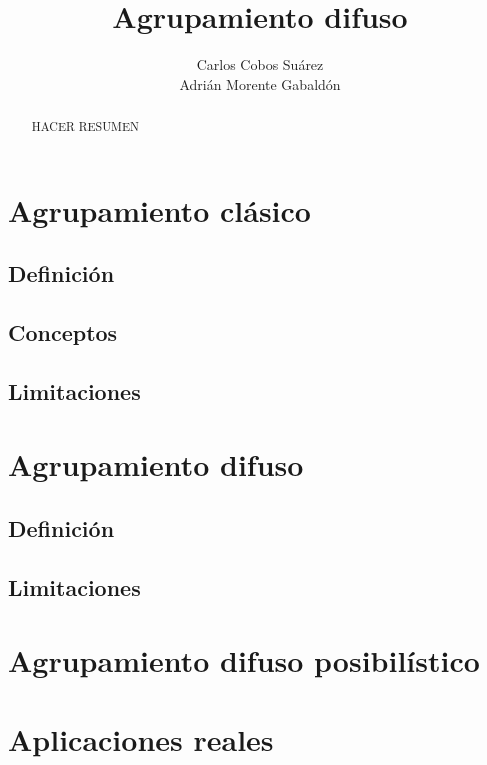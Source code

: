 \documentclass[]{report}
\title{Agrupamiento difuso}
\author{Carlos Cobos Suárez\\Adrián Morente Gabaldón}
\begin{document}
\maketitle

\begin{abstract}
	HACER RESUMEN
\end{abstract}

	\chapter{Agrupamiento clásico}
	
		\section{Definición}
		
		\section{Conceptos}
		
		\section{Limitaciones}
	
	\chapter{Agrupamiento difuso}
	
		\section{Definición}
		
		\section{Limitaciones}
	
	\chapter{Agrupamiento difuso posibilístico}
	
	\chapter{Aplicaciones reales}
	


\end{document}
